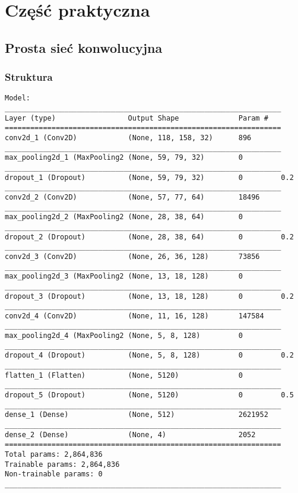 \chapter{Część praktyczna}
\label{cha:praktyka}

\section{Prosta sieć konwolucyjna}
\subsection{Struktura}
\begin{verbatim}
Model:
_________________________________________________________________
Layer (type)                 Output Shape              Param #   
=================================================================
conv2d_1 (Conv2D)            (None, 118, 158, 32)      896       
_________________________________________________________________
max_pooling2d_1 (MaxPooling2 (None, 59, 79, 32)        0         
_________________________________________________________________
dropout_1 (Dropout)          (None, 59, 79, 32)        0         0.2
_________________________________________________________________
conv2d_2 (Conv2D)            (None, 57, 77, 64)        18496     
_________________________________________________________________
max_pooling2d_2 (MaxPooling2 (None, 28, 38, 64)        0         
_________________________________________________________________
dropout_2 (Dropout)          (None, 28, 38, 64)        0         0.2
_________________________________________________________________
conv2d_3 (Conv2D)            (None, 26, 36, 128)       73856     
_________________________________________________________________
max_pooling2d_3 (MaxPooling2 (None, 13, 18, 128)       0         
_________________________________________________________________
dropout_3 (Dropout)          (None, 13, 18, 128)       0         0.2
_________________________________________________________________
conv2d_4 (Conv2D)            (None, 11, 16, 128)       147584    
_________________________________________________________________
max_pooling2d_4 (MaxPooling2 (None, 5, 8, 128)         0         
_________________________________________________________________
dropout_4 (Dropout)          (None, 5, 8, 128)         0         0.2
_________________________________________________________________
flatten_1 (Flatten)          (None, 5120)              0         
_________________________________________________________________
dropout_5 (Dropout)          (None, 5120)              0         0.5
_________________________________________________________________
dense_1 (Dense)              (None, 512)               2621952   
_________________________________________________________________
dense_2 (Dense)              (None, 4)                 2052      
=================================================================
Total params: 2,864,836
Trainable params: 2,864,836
Non-trainable params: 0
_________________________________________________________________
\end{verbatim}

